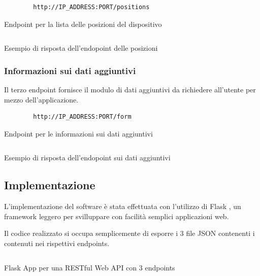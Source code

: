 \begin{listing}[H] 
    \begin{verbatim}
        http://IP_ADDRESS:PORT/positions
    \end{verbatim}
    \caption{Endpoint per la lista delle posizioni del dispositivo}
    \label{listing:endpoint-positions}
\end{listing}
\begin{listing}[H] 
    \inputminted[frame=single,framesep=10pt]{json}{assets/snippets/server/api/positions.json}
    \caption{Esempio di risposta dell'endopoint delle posizioni}
\end{listing}

\subsubsection{Informazioni sui dati aggiuntivi}
Il terzo endpoint fornisce il modulo di dati aggiuntivi da richiedere all'utente per mezzo dell'applicazione.

\begin{listing}[H] 
    \begin{verbatim}
        http://IP_ADDRESS:PORT/form
    \end{verbatim}
    \caption{Endpoint per le informazioni sui dati aggiuntivi}
    \label{listing:endpoint-form}
\end{listing}
\begin{listing}[H] 
    \inputminted[frame=single,framesep=10pt]{json}{assets/snippets/server/api/form.json}
    \caption{Esempio di risposta dell'endopoint sui dati aggiuntivi}
\end{listing}

\subsection{Implementazione}
L'implementazione del software è stata effettuata con l'utilizzo di Flask \cite{flask}, un framework leggero 
per svilluppare con facilità semplici applicazioni web.

Il codice realizzato si occupa semplicemente di esporre i 3 file JSON contenenti i contenuti nei rispettivi endpoints.

\begin{listing}[H] 
    \inputminted[frame=single,framesep=10pt]{python}{assets/snippets/server/api/flask.py}
    \caption{Flask App per una RESTful Web API con 3 endpoints}
\end{listing}



